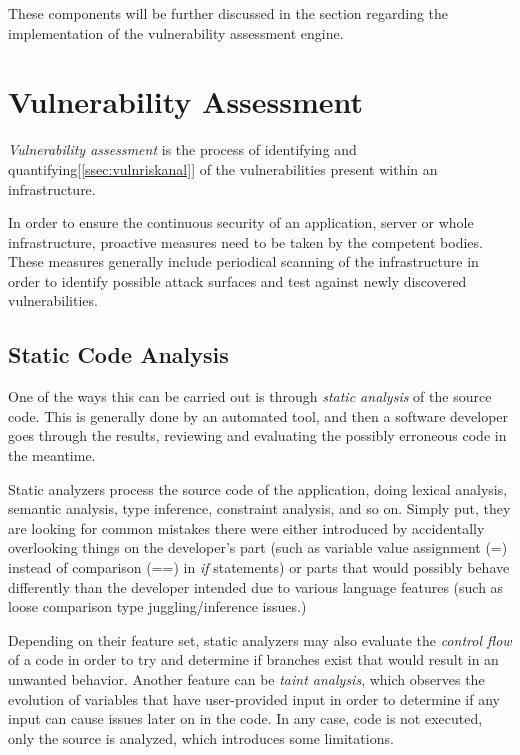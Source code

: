 \documentclass[a4paper,12pt]{article}
\begin{document}
	These components will be further discussed in the section regarding the implementation of the vulnerability assessment engine.
	
\newpage
\section{Vulnerability Assessment}
	
	\textit{Vulnerability assessment} is the process of identifying and quantifying[\ref{ssec:vulnriskanal}] of the vulnerabilities present within an infrastructure.
	
	In order to ensure the continuous security of an application, server or whole infrastructure, proactive measures need to be taken by the competent bodies. These measures generally include periodical scanning of the infrastructure in order to identify possible attack surfaces and test against newly discovered vulnerabilities.
	
\subsection{Static Code Analysis}
	
	One of the ways this can be carried out is through \textit{static analysis} of the source code. This is generally done by an automated tool, and then a software developer goes through the results, reviewing and evaluating the possibly erroneous code in the meantime.
	
	Static analyzers process the source code of the application, doing lexical analysis, semantic analysis, type inference, constraint analysis, and so on. Simply put, they are looking for common mistakes there were either introduced by accidentally overlooking things on the developer's part (such as variable value assignment (=) instead of comparison (==) in \textit{if} statements) or parts that would possibly behave differently than the developer intended due to various language features (such as loose comparison type juggling/inference issues.)
	
	Depending on their feature set, static analyzers may also evaluate the \textit{control flow} of a code in order to try and determine if branches exist that would result in an unwanted behavior. Another feature can be \textit{taint analysis}, which observes the evolution of variables that have user-provided input in order to determine if any input can cause issues later on in the code. In any case, code is not executed, only the source is analyzed, which introduces some limitations.
	
\end{document}
